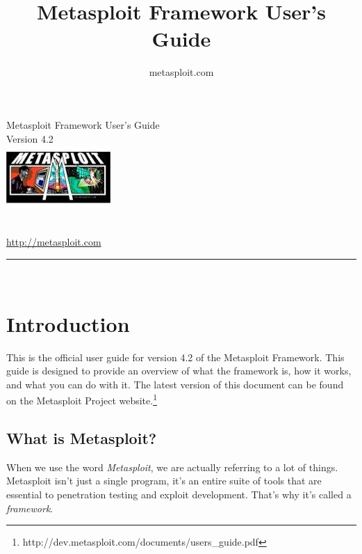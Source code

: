 \documentclass{report}
\begin{document}
\title{Metasploit Framework User's Guide}
\author{metasploit.com}

\begin{titlepage}
    \begin{center}
        \huge{Metasploit Framework User's Guide}
		\ \\[10mm]
		\large{Version 4.2}
		\\[10mm]

        \includegraphics{hacker04.jpg}
		
		\ \\[10mm]
		
        \small{\url{http://metasploit.com}}

        \rule{10cm}{1pt} \\[4mm]
        \renewcommand{\arraystretch}{0.5}
    \end{center}
\end{titlepage}

\tableofcontents

\setlength{\parindent}{0pt} \setlength{\parskip}{8pt}

\chapter{Introduction}

\par
This is the official user guide for version 4.2 of the Metasploit Framework.
This guide is designed to provide an overview of what the framework is, how it
works, and what you can do with it. The latest version of this document can be
found on the Metasploit Project
website.\footnote{http://dev.metasploit.com/documents/users\_guide.pdf}

    \section{What is Metasploit?}
    \label{WHAT-IS-METASPLOIT}

\par
When we use the word \textit{Metasploit}, we are actually referring to a lot of
things. Metasploit isn't just a single program, it's an entire suite of tools
that are essential to penetration testing and exploit development. That's why
it's called a \textit{framework}.
\end{document}

